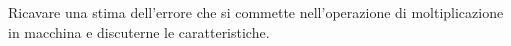 Ricavare una stima dell'errore che si commette nell'operazione di 
moltiplicazione in macchina e discuterne le caratteristiche.
